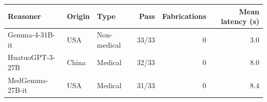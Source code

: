 \begin{tabular}{@{}lllrrr@{}}
\toprule
Reasoner & Origin & Type & Pass & Fabrications & Mean latency (s) \\
\midrule
Gemma-4-31B-it & USA & Non-medical & 33/33 & 0 & 3.0 \\
HuatuoGPT-3-27B & China & Medical & 32/33 & 0 & 8.0 \\
MedGemma-27B-it & USA & Medical & 31/33 & 0 & 8.4 \\
\bottomrule
\end{tabular}
